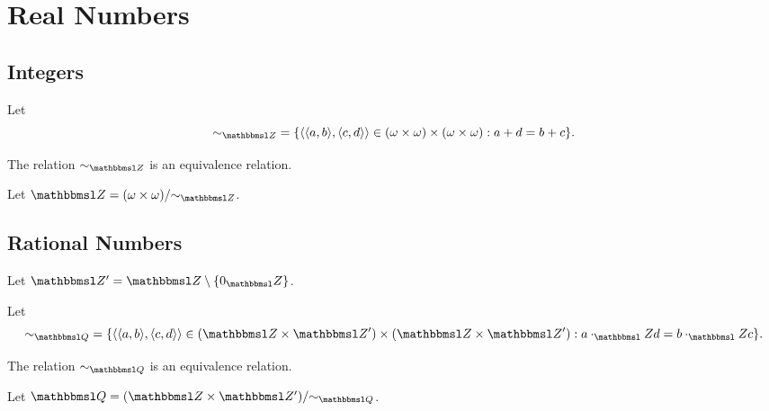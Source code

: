 \chapter{Real Numbers}
\section{Integers}
\begin{definition}
  Let
  \begin{equation*}
    \eqrel{\ZZ}
    = \{\langle \langle a, b \rangle, \langle c, d \rangle \rangle
    \in (\omega \times \omega) \times (\omega \times \omega) :
    a + d = b + c \}.
  \end{equation*}
\end{definition}

\begin{theorem}
  The relation $\eqrel{\ZZ}$ is an equivalence relation.
\end{theorem}

\begin{definition}
  Let $\ZZ = (\omega \times \omega) / \eqrel{\ZZ}$.
\end{definition}

\section{Rational Numbers}
\begin{definition}
  Let $\ZZ' = \ZZ \setminus \{0_\ZZ\}$.
\end{definition}

\begin{definition}
  Let
  \begin{equation*}
    \eqrel{\QQ}
    = \{\langle \langle a, b \rangle, \langle c, d \rangle \rangle
    \in (\ZZ \times \ZZ') \times (\ZZ \times \ZZ') :
    a \cdot_\ZZ d = b \cdot_\ZZ c \}.
  \end{equation*}
\end{definition}

\begin{theorem}
  The relation $\eqrel{\QQ}$ is an equivalence relation.
\end{theorem}

\begin{definition}
  Let $\QQ = (\ZZ \times \ZZ') / \eqrel{\QQ}$.
\end{definition}
